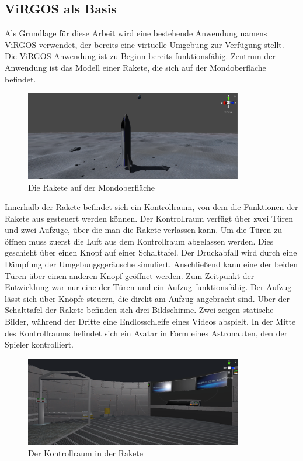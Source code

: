 \subsection{ViRGOS als Basis}
Als Grundlage für diese Arbeit wird eine bestehende Anwendung namens ViRGOS verwendet, der bereits eine virtuelle Umgebung zur Verfügung stellt. Die ViRGOS-Anwendung ist zu Beginn bereits funktionsfähig. Zentrum der Anwendung ist das Modell einer Rakete, die sich auf der Mondoberfläche befindet. \newline

\begin{figure}[H]
\centering
\includegraphics[width=0.85\textwidth]{VirgosRakete.PNG}
\caption{Die Rakete auf der Mondoberfläche}
\end{figure}

Innerhalb der Rakete befindet sich ein Kontrollraum, von dem die Funktionen der Rakete aus gesteuert werden können. Der Kontrollraum verfügt über zwei Türen und zwei Aufzüge, über die man die Rakete verlassen kann. Um die Türen zu öffnen muss zuerst die Luft aus dem Kontrollraum abgelassen werden. Dies geschieht über einen Knopf auf einer Schalttafel. Der Druckabfall wird durch eine Dämpfung der Umgebungsgeräusche simuliert. Anschließend kann eine der beiden Türen über einen anderen Knopf geöffnet werden. Zum Zeitpunkt der Entwicklung war nur eine der Türen und ein Aufzug funktionsfähig. Der Aufzug lässt sich über Knöpfe steuern, die direkt am Aufzug angebracht sind. Über der Schalttafel der Rakete befinden sich drei Bildschirme. Zwei zeigen statische Bilder, während der Dritte eine Endlosschleife eines Videos abspielt. In der Mitte des Kontrollraums befindet sich ein Avatar in Form eines Astronauten, den der Spieler kontrolliert.\newline

\begin{figure}[H]
\centering
\includegraphics[width=0.85\textwidth]{VirgosKommandozentrale.PNG}
\caption{Der Kontrollraum in der Rakete}
\end{figure}

